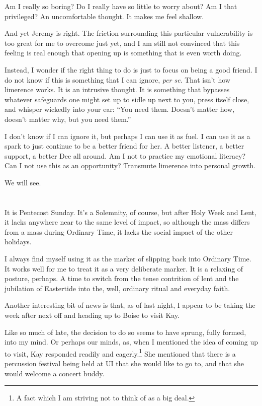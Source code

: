 Am I really so boring? Do I really have so little to worry about? Am I that privileged? An uncomfortable thought. It makes me feel shallow.

And yet Jeremy is right. The friction surrounding this particular vulnerability is too great for me to overcome just yet, and I am still not convinced that this feeling is real enough that opening up is something that is even worth doing.

Instead, I wonder if the right thing to do is just to focus on being a good friend. I do not know if this is something that I can ignore, \emph{per se}. That isn't how limerence works. It is an intrusive thought. It is something that bypasses whatever safeguards one might set up to sidle up next to you, press itself close, and whisper wickedly into your ear: ``You need them. Doesn't matter how, doesn't matter why, but you need them.''

I don't know if I can ignore it, but perhaps I can use it as fuel. I can use it as a spark to just continue to be a better friend for her. A better listener, a better support, a better Dee all around. Am I not to practice my emotional literacy? Can I not use this as an opportunity? Transmute limerence into personal growth.

We will see.

\section{}

It is Pentecost Sunday. It's a Solemnity, of course, but after Holy Week and Lent, it lacks anywhere near to the same level of impact, so although the mass differs from a mass during Ordinary Time, it lacks the social impact of the other holidays.

I always find myself using it as the marker of slipping back into Ordinary Time. It works well for me to treat it as a very deliberate marker. It is a relaxing of posture, perhaps. A time to switch from the tense contrition of lent and the jubilation of Eastertide into the, well, ordinary ritual and everyday faith.

Another interesting bit of news is that, as of last night, I appear to be taking the week after next off and heading up to Boise to visit Kay.

Like so much of late, the decision to do so seems to have sprung, fully formed, into my mind. Or perhaps our minds, as, when I mentioned the idea of coming up to visit, Kay responded readily and eagerly.\footnote{A fact which I am striving not to think of as a big deal.} She mentioned that there is a percussion festival being held at UI that she would like to go to, and that she would welcome a concert buddy.

